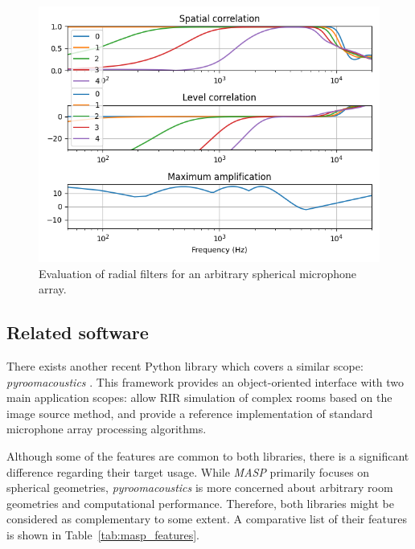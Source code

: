 \begin{figure}[h!]
  \centering
    \includegraphics[width=1\textwidth]{Figures/DataGeneration/sht_filters.png}
    \caption{Evaluation of radial filters for an arbitrary spherical microphone array.}
    \label{fig:sht_filters}
\end{figure}

\subsection{Related software}

There exists another recent Python library which covers a similar scope: \textit{pyroomacoustics} \cite{scheibler2018pyroomacoustics}.
This framework provides an object-oriented interface with two main application scopes: allow RIR simulation of complex rooms based on the image source method, and provide a reference implementation of standard microphone array processing algorithms. 

Although some of the features are common to both libraries, there is a significant difference regarding their target usage. While \textit{MASP} primarily focuses on spherical geometries, \textit{pyroomacoustics} is more concerned about arbitrary room geometries and computational performance. 
Therefore, both libraries might be considered as complementary to some extent. 
A comparative list of their features is shown in Table~\ref{tab:masp_features}.



